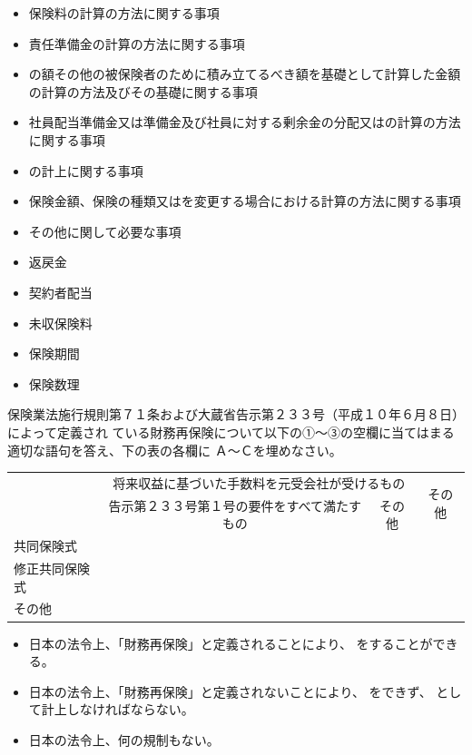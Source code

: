 \documentclass[report,gutter=10mm,fore-edge=10mm,uplatex,dvipdfmx]{jlreq}
\begin{document}
\begin{itemize}
\item[ ] 保険料の計算の方法に関する事項
\item[ ] 責任準備金の計算の方法に関する事項
\item[ ] の額その他の被保険者のために積み立てるべき額を基礎として計算した金額の計算の方法及びその基礎に関する事項
\item[ ] 社員配当準備金又は準備金及び社員に対する剰余金の分配又はの計算の方法に関する事項
\item[ ] の計上に関する事項
\item[ ] 保険金額、保険の種類又はを変更する場合における計算の方法に関する事項
\item[ ] その他に関して必要な事項
\end{itemize}

\answer{}
\begin{itemize}
\item[①:]  返戻金
\item[②:]  契約者配当
\item[③:]  未収保険料
\item[④:]  保険期間
\item[⑤:]  保険数理
\end{itemize}

保険業法施行規則第７１条および大蔵省告示第２３３号（平成１０年６月８日）によって定義され
ている財務再保険について以下の①～③の空欄に当てはまる適切な語句を答え、下の表の各欄に
Ａ～Ｃを埋めなさい。

\begin{tabular}{|l|c|c|c|}
 \hline
\multirow{2}{*}{}& \multicolumn{2}{c|}{将来収益に基づいた手数料を元受会社が受けるもの}
 &\multirow{2}{*}{その他}\\  \cline{2-3}
&告示第２３３号第１号の要件をすべて満たすもの&その他&\\ \hline
共同保険式  & & & \\ \hline
修正共同保険式 & & & \\ \hline
その他 & & & \\ \hline
\end{tabular}

\begin{itemize}
\item[ Ａ：] 日本の法令上、「財務再保険」と定義されることにより、 をすることができる。
\item[ Ｂ：] 日本の法令上、「財務再保険」と定義されないことにより、 をできず、 として計上しなければならない。
\item[ Ｃ：] 日本の法令上、何の規制もない。
\end{itemize}
\answer{}
\end{document}

